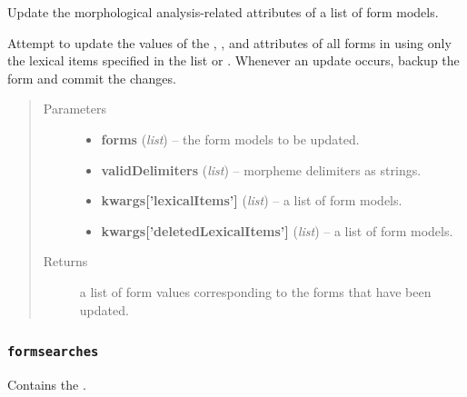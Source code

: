 \documentclass[letterpaper,10pt,english]{sphinxmanual}
\begin{document}
\begin{fulllineitems}
\label{api:onlinelinguisticdatabase.controllers.forms.updateMorphemeReferencesOfForms}
Update the morphological analysis-related attributes of a list of form models.

Attempt to update the values of the ,
,  and 
attributes of all forms in  using only the lexical items specified
in the list  or .
Whenever an update occurs, backup the form and commit the changes.
\begin{quote}\begin{description}
\item[{Parameters}] \leavevmode\begin{itemize}
\item {} 
\textbf{forms} (\emph{list}) -- the form models to be updated.

\item {} 
\textbf{validDelimiters} (\emph{list}) -- morpheme delimiters as strings.

\item {} 
\textbf{kwargs{[}'lexicalItems'{]}} (\emph{list}) -- a list of form models.

\item {} 
\textbf{kwargs{[}'deletedLexicalItems'{]}} (\emph{list}) -- a list of form models.

\end{itemize}

\item[{Returns}] \leavevmode
a list of form  values corresponding to the forms that have
been updated.

\end{description}\end{quote}

\end{fulllineitems}



\subsubsection{\texttt{formsearches}}
\label{api:module-onlinelinguisticdatabase.controllers.formsearches}\label{api:formsearches}
Contains the {\hyperref[api:onlinelinguisticdatabase.controllers.formsearches.FormsearchesController]{}}.
\label{api:module-formsearches}
\end{document}

